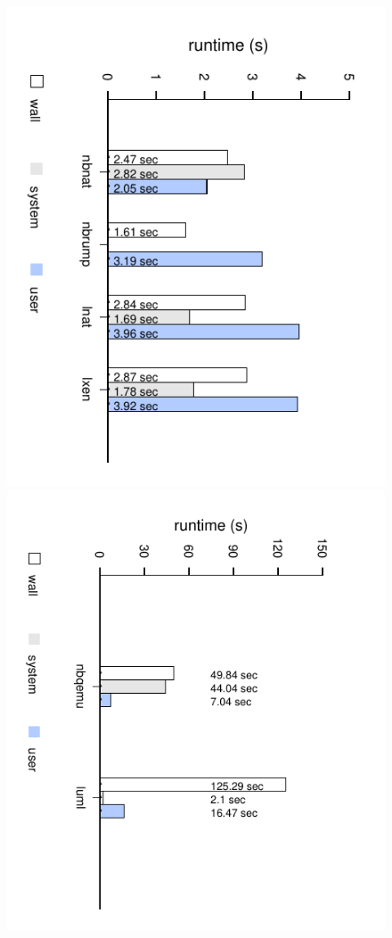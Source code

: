 \begin{figure}
\includegraphics[angle=90]{syscall3}
\includegraphics[angle=90]{syscall3-2}

\end{figure}
